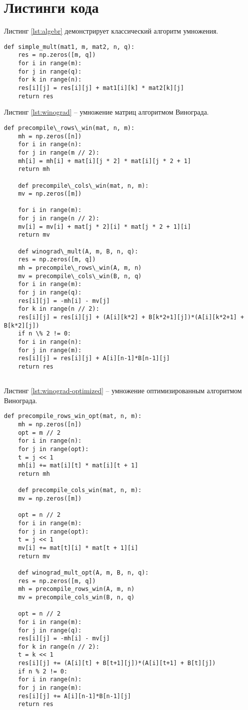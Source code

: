 \section{Листинги кода}
Листинг \ref{lst:algebr} демонстрирует классический алгоритм умножения. 


\captionsetup{singlelinecheck = false, justification=raggedright}
\begin{lstlisting}[label=lst:algebr,caption=Классический алгоритм умножения]
	def simple_mult(mat1, m, mat2, n, q):
	res = np.zeros([m, q])
	for i in range(m):
	for j in range(q):
	for k in range(n):
	res[i][j] = res[i][j] + mat1[i][k] * mat2[k][j]
	return res
\end{lstlisting}

\newpage
Листинг \ref{lst:winograd} -- умножение матриц алгоритмом Винограда.

\begin{lstlisting}[label=lst:winograd,caption=Алгоритм умнложения Виноградом]
	def precompile\_rows\_win(mat, n, m):
	mh = np.zeros([n])
	for i in range(n):
	for j in range(m // 2):
	mh[i] = mh[i] + mat[i][j * 2] * mat[i][j * 2 + 1]
	return mh
	
	def precompile\_cols\_win(mat, n, m):
	mv = np.zeros([m])
	
	for i in range(m):
	for j in range(n // 2):
	mv[i] = mv[i] + mat[j * 2][i] * mat[j * 2 + 1][i]
	return mv
	
	def winograd\_mult(A, m, B, n, q):
	res = np.zeros([m, q])
	mh = precompile\_rows\_win(A, m, n)
	mv = precompile\_cols\_win(B, n, q)
	for i in range(m):
	for j in range(q):
	res[i][j] = -mh[i] - mv[j]
	for k in range(n // 2):
	res[i][j] = res[i][j] + (A[i][k*2] + B[k*2+1][j])*(A[i][k*2+1] + B[k*2][j])
	if n \% 2 != 0:
	for i in range(n):
	for j in range(m):
	res[i][j] = res[i][j] + A[i][n-1]*B[n-1][j]
	return res
	
\end{lstlisting}	

\newpage
Листинг \ref{lst:winograd-optimized} -- умножение оптимизированным алгоритмом Винограда.
\begin{lstlisting}[label=lst:winograd-optimized,caption=Оптимизированный алгоритм умножения Виноградом]
	def precompile_rows_win_opt(mat, n, m):
	mh = np.zeros([n])
	opt = m // 2
	for i in range(n):
	for j in range(opt):
	t = j << 1
	mh[i] += mat[i][t] * mat[i][t + 1]
	return mh
	
	def precompile_cols_win(mat, n, m):
	mv = np.zeros([m])
	
	opt = n // 2
	for i in range(m):
	for j in range(opt):
	t = j << 1
	mv[i] += mat[t][i] * mat[t + 1][i]
	return mv
	
	def winograd_mult_opt(A, m, B, n, q):
	res = np.zeros([m, q])
	mh = precompile_rows_win(A, m, n)
	mv = precompile_cols_win(B, n, q)
	
	opt = n // 2
	for i in range(m):
	for j in range(q):
	res[i][j] = -mh[i] - mv[j]
	for k in range(n // 2):
	t = k << 1
	res[i][j] += (A[i][t] + B[t+1][j])*(A[i][t+1] + B[t][j])
	if n % 2 != 0:
	for i in range(n):
	for j in range(m):
	res[i][j] += A[i][n-1]*B[n-1][j]
	return res
\end{lstlisting}


